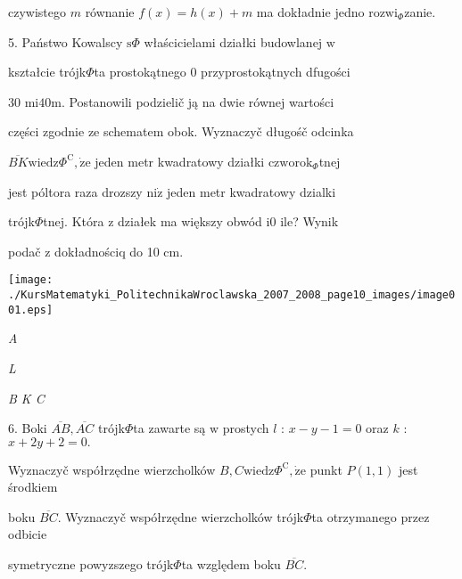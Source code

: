 \documentclass[a4paper,12pt]{article}
\begin{document}
czywistego $m$ równanie $f(x)=h(x)+m$ ma dokładnie jedno $\mathrm{r}\mathrm{o}\mathrm{z}\mathrm{w}\mathrm{i}_{\Phi}$zanie.

5. Państwo Kowalscy $\mathrm{s}\Phi$ właścicielami działki budowlanej $\mathrm{w}$

kształcie trójk$\Phi$ta prostokątnego $0$ przyprostokątnych dfugości

30 $\mathrm{m}\mathrm{i}40\mathrm{m}$. Postanowili podzielič ją na dwie równej wartości

części zgodnie ze schematem obok. Wyznaczyč długośč odcinka

$\overline{BK}\mathrm{w}\mathrm{i}\mathrm{e}\mathrm{d}\mathrm{z}\Phi^{\mathrm{C}}, \dot{\mathrm{z}}\mathrm{e}$ jeden metr kwadratowy działki $\mathrm{c}\mathrm{z}\mathrm{w}\mathrm{o}\mathrm{r}\mathrm{o}\mathrm{k}_{\Phi}$tnej

jest póltora raza drozszy $\mathrm{n}\mathrm{i}\dot{\mathrm{z}}$ jeden metr kwadratowy dzialki

trójk$\Phi$tnej. Która $\mathrm{z}$ działek ma większy obwód $\mathrm{i}0$ ile? Wynik

podač $\mathrm{z}$ dokładnościq do 10 cm.
\begin{center}
\texttt{[image: ./KursMatematyki\_PolitechnikaWroclawska\_2007\_2008\_page10\_images/image001.eps]}
\end{center}
{\it A}

{\it L}

{\it B  K C}

6. Boki $\overline{AB}, \overline{AC}$ trójk$\Phi$ta zawarte są $\mathrm{w}$ prostych $l$ : $x-y-1=0$ oraz $k$ : $x+2y+2=0.$

Wyznaczyč współrzędne wierzcholków $B, C \mathrm{w}\mathrm{i}\mathrm{e}\mathrm{d}\mathrm{z}\Phi^{\mathrm{C}}, \dot{\mathrm{z}}\mathrm{e}$ punkt $P(1,1)$ jest środkiem

boku $\overline{BC}$. Wyznaczyč współrzędne wierzcholków trójk$\Phi$ta otrzymanego przez odbicie

symetryczne powyzszego trójk$\Phi$ta względem boku $\overline{BC}.$
\end{document}
